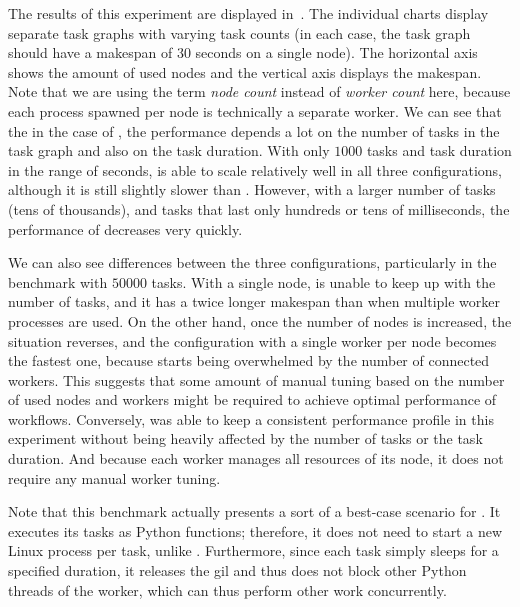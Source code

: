 The results of this experiment are displayed in~. The individual charts
display separate task graphs with varying task counts (in each case, the task graph should have a
makespan of $30$ seconds on a single node). The horizontal axis shows the amount
of used nodes and the vertical axis displays the makespan. Note that we are using the term
\emph{node count} instead of \emph{worker count} here, because each
\dask{} process spawned per node is technically a separate worker. We can see that
the in the case of \dask{}, the performance depends a lot on the number of tasks in
the task graph and also on the task duration. With only $1000$ tasks and task
duration in the range of seconds, \dask{} is able to scale relatively well in all
three configurations, although it is still slightly slower than \hyperqueue{}. However,
with a larger number of tasks (tens of thousands), and tasks that last only hundreds or tens of
milliseconds, the performance of \dask{} decreases very quickly.

We can also see differences between the three \dask{} configurations, particularly
in the benchmark with $50000$ tasks. With a single node, \dask{} is
unable to keep up with the number of tasks, and it has a twice longer makespan than when multiple
worker processes are used. On the other hand, once the number of nodes is increased, the situation
reverses, and the configuration with a single worker per node becomes the fastest one, because
\dask{} starts being overwhelmed by the number of connected workers. This suggests
that some amount of manual tuning based on the number of used nodes and workers might be required
to achieve optimal performance of \dask{} workflows. Conversely,
\hyperqueue{} was able to keep a consistent performance profile in this experiment
without being heavily affected by the number of tasks or the task duration. And because each
\hq{} worker manages all resources of its node, it does not require
any manual worker tuning.

Note that this benchmark actually presents a sort of a best-case scenario for
\dask{}. It executes its tasks as Python functions; therefore, it does not need to
start a new Linux process per task, unlike \hyperqueue{}. Furthermore, since each task
simply sleeps for a specified duration, it releases the \gls{gil} and thus does not
block other Python threads of the worker, which can thus perform other work concurrently.

